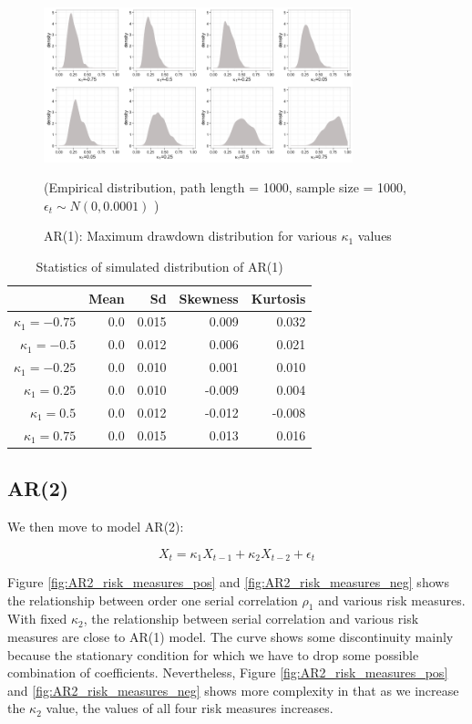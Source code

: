 \documentclass[11pt]{article}
\begin{document}
\begin{figure}[H]
\centering
\includegraphics[width = 0.8\textwidth]{../figures/simulation/AR1_maxDrawdown_dist}
\caption{AR(1): Maximum drawdown distribution for various $\kappa_1$ values }
(Empirical distribution, path length = 1000, sample size = 1000, $\epsilon_t \sim N(0, 0.0001)$ )
\label{fig:AR1_maxDrawdown_dist}
\end{figure}

\begin{table}[H]
\centering
\begin{tabular}{|r |r r r r|}
\hline
& Mean & Sd & Skewness & Kurtosis \\
\hline
$\kappa_1 = -0.75$ & 0.0 & 0.015 & 0.009 & 0.032\\
$\kappa_1 = -0.5$ & 0.0 & 0.012 & 0.006 & 0.021\\
$\kappa_1 = -0.25$ & 0.0 & 0.010 & 0.001 & 0.010\\
$\kappa_1 = 0.25$ & 0.0 & 0.010 & -0.009 & 0.004\\
$\kappa_1 = 0.5$ & 0.0 & 0.012 & -0.012 & -0.008\\
$\kappa_1 = 0.75$ & 0.0 & 0.015 & 0.013 & 0.016\\
\hline
\end{tabular}
\caption{Statistics of simulated distribution of AR(1)}
\label{table: AR1_return}
\end{table}

\subsection{AR(2)} %

We then move to model AR(2):

\begin{equation}
X_t = \kappa_1X_{t-1} + \kappa_2X_{t-2}  + \epsilon_t
\end{equation}

Figure \ref{fig:AR2_risk_measures_pos} and \ref{fig:AR2_risk_measures_neg} shows the relationship between order one serial correlation $\rho_1$ and various risk measures. With fixed $\kappa_2$, the relationship between serial correlation and various risk measures are close to AR(1) model. The curve shows some discontinuity mainly because the stationary condition for which we have to drop some possible combination of coefficients. Nevertheless, Figure \ref{fig:AR2_risk_measures_pos} and \ref{fig:AR2_risk_measures_neg} shows more complexity in that as we increase the $\kappa_2$ value, the values of all four risk measures increases.
\end{document}
